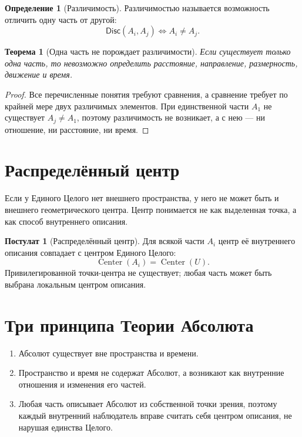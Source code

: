 \documentclass[12pt,a4paper,oneside]{book}
\theoremstyle{definition}
\newtheorem{definition}{Определение}[chapter]
\newtheorem{postulate}{Постулат}[chapter]
\theoremstyle{plain}
\newtheorem{theorem}{Теорема}[chapter]
\theoremstyle{remark}
\newcommand{\Whole}{U}
\newcommand{\Disc}{\mathsf{Disc}}
\newcommand{\Center}{\operatorname{Center}}
\begin{document}
\begin{definition}[Различимость]
Различимостью называется возможность отличить одну часть от другой:
\[
\Disc(A_i,A_j)\iff A_i\neq A_j.
\]
\end{definition}

\begin{theorem}[Одна часть не порождает различимости]
Если существует только одна часть, то невозможно определить расстояние, направление,
размерность, движение и время.
\end{theorem}

\begin{proof}
Все перечисленные понятия требуют сравнения, а сравнение требует по крайней мере двух
различимых элементов. При единственной части $A_1$ не существует $A_j\neq A_1$,
поэтому различимость не возникает, а с нею --- ни отношение, ни расстояние, ни время.
\end{proof}

\section{Распределённый центр}

Если у Единого Целого нет внешнего пространства, у него не может быть и внешнего
геометрического центра. Центр понимается не как выделенная точка, а как способ
внутреннего описания.

\begin{postulate}[Распределённый центр]
Для всякой части $A_i$ центр её внутреннего описания совпадает с центром Единого
Целого:
\[
\Center(A_i)=\Center(\Whole).
\]
Привилегированной точки-центра не существует; любая часть может быть выбрана
локальным центром описания.
\end{postulate}

\section{Три принципа Теории Абсолюта}

\begin{enumerate}
    \item Абсолют существует вне пространства и времени.
    \item Пространство и время не содержат Абсолют, а возникают как внутренние
    отношения и изменения его частей.
    \item Любая часть описывает Абсолют из собственной точки зрения, поэтому каждый
    внутренний наблюдатель вправе считать себя центром описания, не нарушая единства
    Целого.
\end{enumerate}
\end{document}
